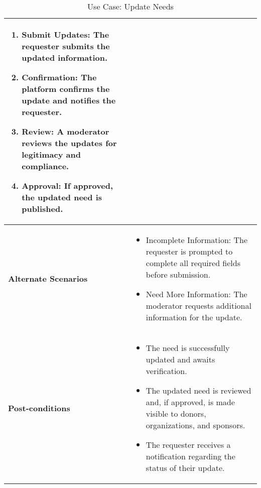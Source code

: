 \begin{table}[!ht]
\begin{tabularx}{\textwidth}{|l|X|}
\begin{enumerate}[label=\arabic*.,itemsep=0pt]
            \item Submit Updates: The requester submits the updated information.
            \item Confirmation: The platform confirms the update and notifies the requester.
            \item Review: A moderator reviews the updates for legitimacy and compliance.
            \item Approval: If approved, the updated need is published.
        \end{enumerate} \\
        \hline
        \textbf{Alternate Scenarios} & 
        \begin{itemize}[label=--,itemsep=0pt]
            \item Incomplete Information: The requester is prompted to complete all required fields before submission.
            \item Need More Information: The moderator requests additional information for the update.
        \end{itemize} \\
        \hline

        \textbf{Post-conditions} & 
        \begin{itemize}[label=--,itemsep=0pt]
            \item The need is successfully updated and awaits verification.
            \item The updated need is reviewed and, if approved, is made visible to donors, organizations, and sponsors.
            \item The requester receives a notification regarding the status of their update.
        \end{itemize} \\
        \hline
    \end{tabularx}
    \caption{Use Case: Update Needs}
    \label{tab:use-case-register}
\end{table}


